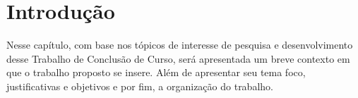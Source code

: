 \chapter*[Introdução]{Introdução}

Nesse capítulo, com base nos tópicos de interesse de pesquisa e desenvolvimento desse Trabalho de Conclusão de Curso, será apresentada um breve contexto em que o trabalho
proposto se insere. Além de apresentar seu tema foco, justificativas e objetivos e por fim, a organização do trabalho.